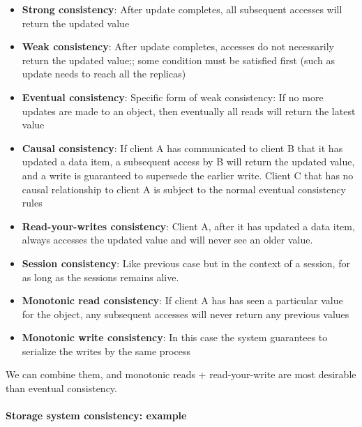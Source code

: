 \begin{itemize}
    \item \textbf{Strong consistency}: After update completes, all subsequent
        accesses will return the updated value

    \item \textbf{Weak consistency}: After update completes, accesses do not
        necessarily return the updated value;; some condition must be satisfied
        first (such as update needs to reach all the replicas)

    \item \textbf{Eventual consistency}: Specific form of weak consistency: If no
        more updates are made to an object, then eventually all reads will return
        the latest value

    \item \textbf{Causal consistency}: If client A has communicated to client B that it
        has updated a data item, a subsequent access by B will return the updated
        value, and a write is guaranteed to supersede the earlier write. Client C
        that has no causal relationship to client A is subject to the normal
        eventual consistency rules

    \item \textbf{Read-your-writes consistency}: Client A, after it has updated a data
        item, always accesses the updated value and will never see an older
        value.

    \item \textbf{Session consistency}: Like previous case but in the context of a
        session, for as long as the sessions remains alive.

    \item \textbf{Monotonic read consistency}: If client A has has seen a particular value
        for the object, any subsequent accesses will never return any previous
        values

    \item \textbf{Monotonic write consistency}: In this case the system guarantees to
        serialize the writes by the same process
\end{itemize}

We can combine them, and monotonic reads + read-your-write are most desirable
than eventual consistency.

\paragraph{Storage system consistency: example}

